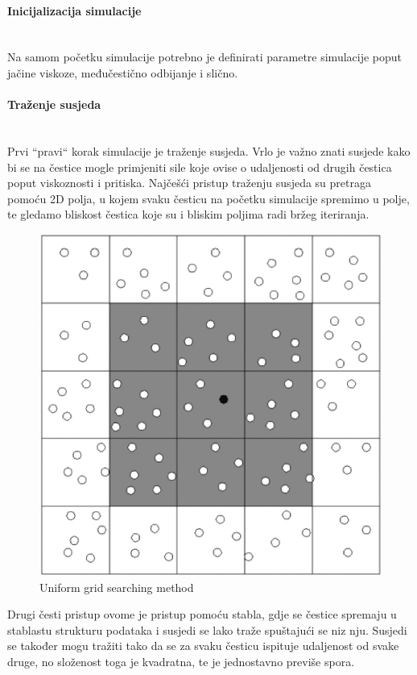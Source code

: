 \documentclass[diplomskirad]{fer}
\newcommand{\paragraphnewline}[1]{\paragraph{#1}\mbox{}\\}
\begin{document}
    \paragraphnewline{Inicijalizacija simulacije}
    Na samom početku simulacije potrebno je definirati parametre simulacije poput jačine viskoze, međučestično odbijanje i slično.

    \paragraphnewline{Traženje susjeda}

    Prvi ``pravi`` korak simulacije je traženje susjeda.
    Vrlo je važno znati susjede kako bi se na čestice mogle primjeniti sile koje ovise o udaljenosti od drugih čestica poput viskoznosti i pritiska.
    Najčešći pristup traženju susjeda su pretraga pomoću 2D polja, u kojem svaku česticu na početku simulacije spremimo u polje, te gledamo bliskost čestica koje su i bliskim poljima radi bržeg iteriranja.

    \begin{figure}[H]
        \centering
        \includegraphics[scale=0.3]{images/Uniform-grid-searching-method}
        \caption{
            Uniform grid searching method \cite{uniformGridSearchingMethod}
        }
        \label{fig:uniformGridSearchingMethod}
    \end{figure}

    \newpage
    Drugi česti pristup ovome je pristup pomoću stabla, gdje se čestice spremaju u stablastu strukturu podataka i susjedi se lako traže spuštajući se niz nju.
    Susjedi se također mogu tražiti tako da se za svaku česticu ispituje udaljenost od svake druge, no složenost toga je kvadratna, te je jednostavno previše spora.
\end{document}
